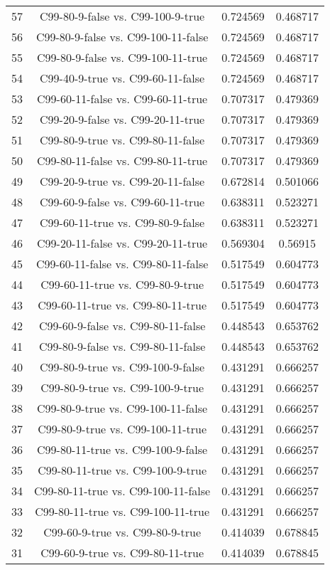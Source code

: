 \documentclass[a4paper,10pt]{article}
\begin{document}
\begin{landscape}
\begin{table}[!htp]
\begin{tabular}{cccc}
57&C99-80-9-false vs. C99-100-9-true&0.724569&0.468717\\
56&C99-80-9-false vs. C99-100-11-false&0.724569&0.468717\\
55&C99-80-9-false vs. C99-100-11-true&0.724569&0.468717\\
54&C99-40-9-true vs. C99-60-11-false&0.724569&0.468717\\
53&C99-60-11-false vs. C99-60-11-true&0.707317&0.479369\\
52&C99-20-9-false vs. C99-20-11-true&0.707317&0.479369\\
51&C99-80-9-true vs. C99-80-11-false&0.707317&0.479369\\
50&C99-80-11-false vs. C99-80-11-true&0.707317&0.479369\\
49&C99-20-9-true vs. C99-20-11-false&0.672814&0.501066\\
48&C99-60-9-false vs. C99-60-11-true&0.638311&0.523271\\
47&C99-60-11-true vs. C99-80-9-false&0.638311&0.523271\\
46&C99-20-11-false vs. C99-20-11-true&0.569304&0.56915\\
45&C99-60-11-false vs. C99-80-11-false&0.517549&0.604773\\
44&C99-60-11-true vs. C99-80-9-true&0.517549&0.604773\\
43&C99-60-11-true vs. C99-80-11-true&0.517549&0.604773\\
42&C99-60-9-false vs. C99-80-11-false&0.448543&0.653762\\
41&C99-80-9-false vs. C99-80-11-false&0.448543&0.653762\\
40&C99-80-9-true vs. C99-100-9-false&0.431291&0.666257\\
39&C99-80-9-true vs. C99-100-9-true&0.431291&0.666257\\
38&C99-80-9-true vs. C99-100-11-false&0.431291&0.666257\\
37&C99-80-9-true vs. C99-100-11-true&0.431291&0.666257\\
36&C99-80-11-true vs. C99-100-9-false&0.431291&0.666257\\
35&C99-80-11-true vs. C99-100-9-true&0.431291&0.666257\\
34&C99-80-11-true vs. C99-100-11-false&0.431291&0.666257\\
33&C99-80-11-true vs. C99-100-11-true&0.431291&0.666257\\
32&C99-60-9-true vs. C99-80-9-true&0.414039&0.678845\\
31&C99-60-9-true vs. C99-80-11-true&0.414039&0.678845\\

\end{tabular}
\end{table}
\end{landscape}
\end{document}
